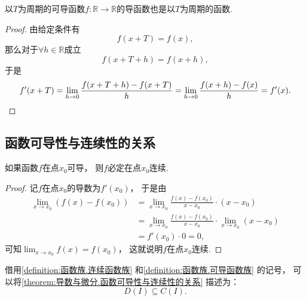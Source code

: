 \begin{proposition}\label{theorem:导数与微分.导函数的周期性}%
以\(T\)为周期的可导函数\(f\colon\mathbb{R}\to\mathbb{R}\)的导函数也是以\(T\)为周期的函数.
\begin{proof}
由给定条件有\begin{equation*}
	f(x+T) = f(x),
\end{equation*}
那么对于\(\forall h\in\mathbb{R}\)成立\begin{equation*}
	f(x+T+h) = f(x+h),
\end{equation*}
于是\begin{equation*}
	f'(x+T)
	= \lim_{h\to0} \frac{f(x+T+h) - f(x+T)}{h}
	= \lim_{h\to0} \frac{f(x+h) - f(x)}{h}
	= f'(x).
	\qedhere
\end{equation*}
\end{proof}
\end{proposition}

\subsection{函数可导性与连续性的关系}
\begin{theorem}\label{theorem:导数与微分.函数可导性与连续性的关系}
如果函数\(f\)在点\(x_0\)可导，
则\(f\)必定在点\(x_0\)连续.
\begin{proof}
记\(f\)在点\(x_0\)的导数为\(f'(x_0)\)，
于是由\begin{align*}
	\lim_{x \to x_0} (f(x) - f(x_0))
	&= \lim_{x \to x_0} \frac{f(x) - f(x_0)}{x - x_0} \cdot (x - x_0) \\
	&= \lim_{x \to x_0} \frac{f(x) - f(x_0)}{x - x_0} \cdot \lim_{x \to x_0} (x - x_0) \\
	&= f'(x_0) \cdot 0
	= 0,
\end{align*}
可知\(\lim_{x \to x_0} f(x) = f(x_0)\)，
这就说明\(f\)在点\(x_0\)连续.
\end{proof}
\end{theorem}
借用\cref{definition:函数族.连续函数族} 和\cref{definition:函数族.可导函数族} 的记号，
可以将\cref{theorem:导数与微分.函数可导性与连续性的关系} 描述为：\begin{equation*}
	D(I) \subseteq C(I).
\end{equation*}

